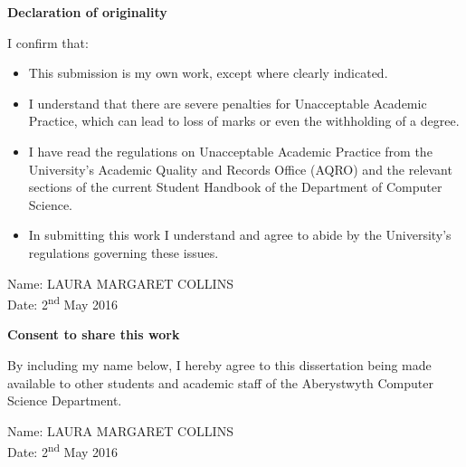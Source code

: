 \thispagestyle{empty}

\begin{center}
    {\LARGE\bf Declaration of originality}
\end{center}

I confirm that:

\begin{itemize}
\item{This submission is my own work, except where clearly indicated.}

\item{I understand that there are severe penalties for Unacceptable Academic Practice, which can lead to loss of marks or even the withholding of a degree.}

\item{I have read the regulations on Unacceptable Academic Practice from the University's Academic Quality and Records Office (AQRO) and the relevant sections of the current Student Handbook of the Department of Computer Science.}

\item{In submitting this work I understand and agree to abide by the University's regulations governing these issues.}
\end{itemize}

\vspace{2em}
Name: LAURA MARGARET COLLINS \\

\vspace{1em}
Date: 2\textsuperscript{nd} May 2016 \\

\vspace{1em}
\begin{center}
    {\LARGE\bf Consent to share this work}
\end{center}

By including my name below, I hereby agree to this dissertation being made available to other
students and academic staff of the Aberystwyth Computer Science Department.

\vspace{2em}
Name: LAURA MARGARET COLLINS  \\

\vspace{1em}
Date: 2\textsuperscript{nd} May 2016 \\

